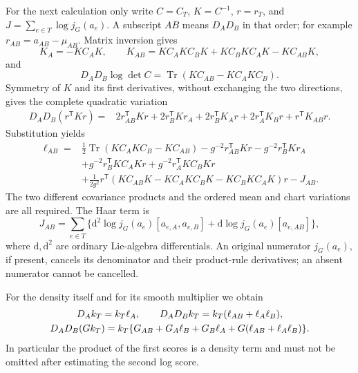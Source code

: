 \documentclass[11pt,reqno]{amsart}
\numberwithin{equation}{section}
\theoremstyle{definition}
\theoremstyle{remark}
\newcommand{\dd}{\mathrm d}
\begin{document}
For the next calculation only write \(C=C_T\), \(K=C^{-1}\),
\(r=r_T\), and \(J=\sum_{e\in T}\log j_G(a_e)\).
A subscript \(AB\) means \(D_AD_B\) in that order; for
example \(r_{AB}=a_{AB}-\mu_{AB}\). Matrix inversion gives
\[
 K_A=-KC_AK,\qquad
 K_{AB}=KC_AKC_BK+KC_BKC_AK-KC_{AB}K,
\]
and
\[
 D_AD_B\log\det C=\operatorname{Tr}(KC_{AB}-KC_AKC_B).
\]
Symmetry of \(K\) and its first derivatives, without exchanging
the two directions, gives the complete quadratic variation
\[
 \begin{split}
 D_AD_B(r^{\mathsf T}Kr)={}&2r_{AB}^{\mathsf T}Kr+2r_B^{\mathsf T}Kr_A
             +2r_B^{\mathsf T}K_Ar+2r_A^{\mathsf T}K_Br+r^{\mathsf T}K_{AB}r.
 \end{split}
\]
Substitution yields
\begin{equation}
 \begin{split}
 \ell_{AB}={}&\tfrac12\operatorname{Tr}(KC_AKC_B-KC_{AB})
       -g^{-2}r_{AB}^{\mathsf T}Kr-g^{-2}r_B^{\mathsf T}Kr_A\\
 &+g^{-2}r_B^{\mathsf T}KC_AKr+g^{-2}r_A^{\mathsf T}KC_BKr\\
 &+\tfrac1{2g^2}r^{\mathsf T}
       (KC_{AB}K-KC_AKC_BK-KC_BKC_AK)r-J_{AB}.
 \end{split}
 \label{eq:output-second-score}
\end{equation}
The two different covariance products and the ordered mean
and chart variations are all required. The Haar term is
\[
 J_{AB}=\sum_{e\in T}
    \{\dd^2\log j_G(a_e)[a_{e,A},a_{e,B}]
                       +\dd\log j_G(a_e)[a_{e,AB}]\},
\]
where \(\dd,\dd^2\) are ordinary Lie-algebra differentials.
An original numerator \(j_G(a_e)\), if present, cancels its
denominator and their product-rule derivatives; an absent
numerator cannot be cancelled.

For the density itself and for its smooth multiplier we obtain
\begin{gather}
 D_Ak_T=k_T\ell_A,\qquad
 D_AD_Bk_T=k_T(\ell_{AB}+\ell_A\ell_B),\notag\\
 D_AD_B(Gk_T)=k_T\{G_{AB}+G_A\ell_B+G_B\ell_A
                                      +G(\ell_{AB}+\ell_A\ell_B)\}.
 \label{eq:output-second-density-product}
\end{gather}
In particular the product of the first scores is a density
term and must not be omitted after estimating the second log
score.
\end{document}
